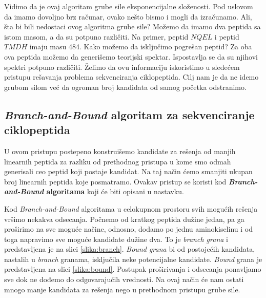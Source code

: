 Vidimo da je ovaj algoritam grube sile eksponencijalne složenosti. Pod uslovom da imamo dovoljno brz računar, ovako nešto bismo i mogli da izračunamo. Ali, šta bi bili nedostaci ovog algoritma grube sile? Možemo da imamo dva peptida sa istom masom, a da su potpuno različiti. Na primer, peptid $NQEL$ i peptid $TMDH$ imaju masu 484. Kako možemo da isključimo pogrešan peptid? Za oba ova peptida možemo da generišemo teorijski spektar. Ispostavlja se da su njihovi spektri potpuno različiti. Želimo da ovu informaciju iskoristimo u sledećem pristupu rešavanja problema sekvenciranja ciklopeptida. Cilj nam je da ne idemo grubom silom već da ogroman broj kandidata od samog početka odstranimo.
\newpage

\subsection{\textit{Branch-and-Bound} algoritam za sekvenciranje ciklopeptida}

U ovom pristupu postepeno konstruišemo kandidate za rešenja od manjih linearnih peptida za razliku od prethodnog pristupa u kome smo odmah generisali ceo peptid koji postaje kandidat. Na taj način ćemo smanjiti ukupan broj linearnih peptida koje posmatramo. Ovakav pristup se koristi kod \textbf{\textit{Branch-and-Bound} algoritama} koji će biti opisani u nastavku.

Kod \textit{Branch-and-Bound} algoritama u celokupnom prostoru svih mogućih rešenja vršimo nekakva odsecanja. Počnemo od kratkog peptida dužine jedan, pa ga proširimo na sve moguće načine, odnosno, dodamo po jednu aminokiselinu i od toga napravimo sve moguće kandidate dužine dva. To je \textit{branch grana} i predstavljena je na slici \ref{slika:branch}. \textit{Bound grana} bi od postojećih kandidata, nastalih u \textit{branch} granama, isključila neke potencijalne kandidate. \textit{Bound} grana je predstavljena na slici \ref{slika:bound}. Postupak proširivanja i odsecanja ponavljamo sve dok ne dođemo do odgovarajućih vrednosti. Na ovaj način će nam ostati mnogo manje kandidata za rešenja nego u prethodnom pristupu grube sile.

